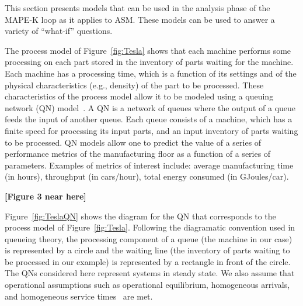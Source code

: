 \documentclass[a4paper, 12pt]{article} %
\begin{document}
This section presents models that can be used in the analysis phase of the MAPE-K loop as it applies to ASM. These models can be used to answer a variety of ``what-if'' questions.

The process model of Figure~\ref{fig:Tesla} shows that each machine performs some processing on each part stored in the inventory of parts waiting for the machine. Each machine has a processing time, which is a function of its settings and of the physical characteristics (e.g., density) of the part to be processed. These characteristics of the process model allow it to be modeled using a queuing network (QN) model~\cite{MAD2004}. A QN is a network of queues where the output of a queue feeds the input of another queue. Each queue consists of a machine, which has a finite speed for processing its input parts, and an input inventory of parts waiting to be processed. QN models allow one to predict the value of a series of  performance metrics of the manufacturing floor as a function of a series of parameters. Examples of metrics of interest include: average manufacturing time (in hours), throughput (in cars/hour),
total energy consumed (in GJoules/car).

{\bf [Figure 3 near here]}

Figure~\ref{fig:TeslaQN} shows the diagram for the QN that corresponds to the process model of Figure~\ref{fig:Tesla}. Following the diagramatic convention used in queueing theory, the processing component of a queue (the machine in our case) is represented by a circle and the waiting line (the inventory of parts waiting to be processed in our example) is represented by a rectangle in front of the circle. The QNs considered here represent systems in steady state. We also assume that operational assumptions such as operational equilibrium, homogeneous arrivals, and homogeneous service times~\cite{buzen} are met.
\end{document}

